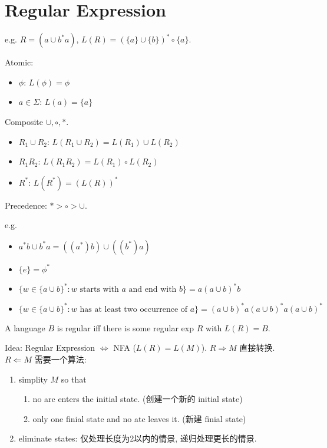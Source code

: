 \newpage

\section{Regular Expression}
e.g. $R=(a\cup b ^* a)$, $L(R)=(\{a\}\cup\{b\})^*\circ \{ a \}$. 

\begin{definition}
    Atomic: 
    \begin{itemize}
        \item $\phi$: $L(\phi)=\phi$
        \item $a\in \Sigma$: $L(a)=\{ a \}$
    \end{itemize}

    Composite $\cup, \circ, *$. 
    \begin{itemize}
        \item $R_1 \cup R_2$: $L(R_1 \cup R_2)=L(R_1)\cup L(R_2)$
        \item $R_1R_2$: $L(R_1R_2)=L(R_1)\circ L(R_2)$
        \item $R^*$: $L(R^*)=(L(R))^*$
    \end{itemize}
    Precedence: $* > \circ > \cup$. 
\end{definition}
e.g. 
\begin{itemize}\small
    \item $a^*b\cup b^* a=((a^*)b)\cup((b^*)a)$
    \item $\{ e \}=\phi^*$
    \item $\{ w\in \{a\cup b\}^*: \text{$w$ starts with $a$ and end with $b$} \}=a(a\cup b)^*b$
    \item $\{ w\in \{a\cup b\}^*: \text{$w$ has at least two occurrence of $a$} \}=(a\cup b)^*a(a\cup b)^*a(a\cup b)^*$
\end{itemize}

\begin{theorem}
    A language $B$ is regular iff there is some regular exp $R$ with $L(R)=B$. 
\end{theorem}
Idea: Regular Expression $\iff$ NFA ($L(R)=L(M)$). $R \Longrightarrow M$ 直接转换. $R \Longleftarrow M$ 需要一个算法: 
\begin{enumerate}
    \item simplity $M$ so that 
    \begin{enumerate}
        \item no arc enters the initial state. (创建一个新的 initial state) 
        \item only one finial state and no atc leaves it. (新建 finial state)
    \end{enumerate}
    \item eliminate states: 仅处理长度为2以内的情景, 递归处理更长的情景. 
\end{enumerate}

